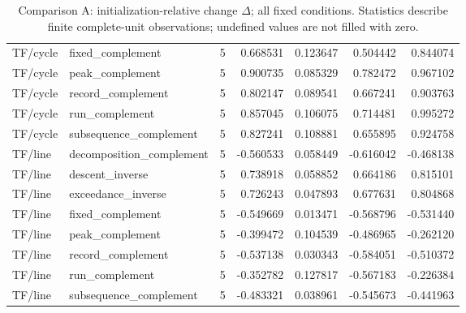 \begin{table}[p]
\begin{tabular}{llrrrrr}
TF/cycle & fixed\_complement & 5 & 0.668531 & 0.123647 & 0.504442 & 0.844074\\
TF/cycle & peak\_complement & 5 & 0.900735 & 0.085329 & 0.782472 & 0.967102\\
TF/cycle & record\_complement & 5 & 0.802147 & 0.089541 & 0.667241 & 0.903763\\
TF/cycle & run\_complement & 5 & 0.857045 & 0.106075 & 0.714481 & 0.995272\\
TF/cycle & subsequence\_complement & 5 & 0.827241 & 0.108881 & 0.655895 & 0.924758\\
TF/line & decomposition\_complement & 5 & -0.560533 & 0.058449 & -0.616042 & -0.468138\\
TF/line & descent\_inverse & 5 & 0.738918 & 0.058852 & 0.664186 & 0.815101\\
TF/line & exceedance\_inverse & 5 & 0.726243 & 0.047893 & 0.677631 & 0.804868\\
TF/line & fixed\_complement & 5 & -0.549669 & 0.013471 & -0.568796 & -0.531440\\
TF/line & peak\_complement & 5 & -0.399472 & 0.104539 & -0.486965 & -0.262120\\
TF/line & record\_complement & 5 & -0.537138 & 0.030343 & -0.584051 & -0.510372\\
TF/line & run\_complement & 5 & -0.352782 & 0.127817 & -0.567183 & -0.226384\\
TF/line & subsequence\_complement & 5 & -0.483321 & 0.038961 & -0.545673 & -0.441963\\
\bottomrule\end{tabular}
\caption{Comparison A: initialization-relative change $\Delta$; all fixed conditions. Statistics describe finite complete-unit observations; undefined values are not filled with zero.}
\label{tab:independent-effect-2}\end{table}
